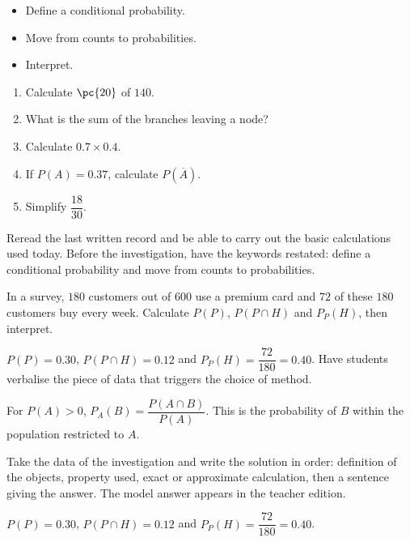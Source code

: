 \begin{objectives}\begin{itemize}\item Define a conditional probability.\item Move from counts to probabilities.\item Interpret.\end{itemize}\end{objectives}
\begin{fluency}\begin{enumerate}\item Calculate $\pc{20}$ of $140$. \item What is the sum of the branches leaving a node? \item Calculate $\num{0,7}\times\num{0,4}$. \item If $P(A)=\num{0,37}$, calculate $P(\overline A)$. \item Simplify $\dfrac{18}{30}$. \end{enumerate}\end{fluency}
\begin{prerequisites}Reread the last written record and be able to carry out the basic calculations used today. Before the investigation, have the keywords restated: define a conditional probability and move from counts to probabilities.\end{prerequisites}

\begin{activity}
In a survey, $180$ customers out of $600$ use a premium card and $72$ of these $180$ customers buy every week. Calculate $P(P)$, $P(P\cap H)$ and $P_P(H)$, then interpret.

\end{activity}
\begin{solution}$P(P)=\num{0,30}$, $P(P\cap H)=\num{0,12}$ and $P_P(H)=\dfrac{72}{180}=\num{0,40}$. Have students verbalise the piece of data that triggers the choice of method.\end{solution}

\begin{summary}For $P(A)>0$, $P_A(B)=\dfrac{P(A\cap B)}{P(A)}$. This is the probability of $B$ within the population restricted to $A$.\end{summary}

\begin{example}
Take the data of the investigation and write the solution in order: definition of the objects, property used, exact or approximate calculation, then a sentence giving the answer. The model answer appears in the teacher edition.
\end{example}
\begin{solution}$P(P)=\num{0,30}$, $P(P\cap H)=\num{0,12}$ and $P_P(H)=\dfrac{72}{180}=\num{0,40}$.\end{solution}

